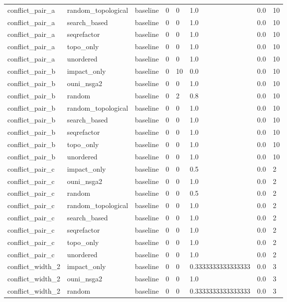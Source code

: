 \begin{table}[t]
\begin{tabular}{llllllll}
conflict\_pair\_a & random\_topological & baseline & 0 & 0 & 1.0 & 0.0 & 10 \\
conflict\_pair\_a & search\_based & baseline & 0 & 0 & 1.0 & 0.0 & 10 \\
conflict\_pair\_a & seqrefactor & baseline & 0 & 0 & 1.0 & 0.0 & 10 \\
conflict\_pair\_a & topo\_only & baseline & 0 & 0 & 1.0 & 0.0 & 10 \\
conflict\_pair\_a & unordered & baseline & 0 & 0 & 1.0 & 0.0 & 10 \\
conflict\_pair\_b & impact\_only & baseline & 0 & 10 & 0.0 & 0.0 & 10 \\
conflict\_pair\_b & ouni\_nsga2 & baseline & 0 & 0 & 1.0 & 0.0 & 10 \\
conflict\_pair\_b & random & baseline & 0 & 2 & 0.8 & 0.0 & 10 \\
conflict\_pair\_b & random\_topological & baseline & 0 & 0 & 1.0 & 0.0 & 10 \\
conflict\_pair\_b & search\_based & baseline & 0 & 0 & 1.0 & 0.0 & 10 \\
conflict\_pair\_b & seqrefactor & baseline & 0 & 0 & 1.0 & 0.0 & 10 \\
conflict\_pair\_b & topo\_only & baseline & 0 & 0 & 1.0 & 0.0 & 10 \\
conflict\_pair\_b & unordered & baseline & 0 & 0 & 1.0 & 0.0 & 10 \\
conflict\_pair\_c & impact\_only & baseline & 0 & 0 & 0.5 & 0.0 & 2 \\
conflict\_pair\_c & ouni\_nsga2 & baseline & 0 & 0 & 1.0 & 0.0 & 2 \\
conflict\_pair\_c & random & baseline & 0 & 0 & 0.5 & 0.0 & 2 \\
conflict\_pair\_c & random\_topological & baseline & 0 & 0 & 1.0 & 0.0 & 2 \\
conflict\_pair\_c & search\_based & baseline & 0 & 0 & 1.0 & 0.0 & 2 \\
conflict\_pair\_c & seqrefactor & baseline & 0 & 0 & 1.0 & 0.0 & 2 \\
conflict\_pair\_c & topo\_only & baseline & 0 & 0 & 1.0 & 0.0 & 2 \\
conflict\_pair\_c & unordered & baseline & 0 & 0 & 1.0 & 0.0 & 2 \\
conflict\_width\_2 & impact\_only & baseline & 0 & 0 & 0.3333333333333333 & 0.0 & 3 \\
conflict\_width\_2 & ouni\_nsga2 & baseline & 0 & 0 & 1.0 & 0.0 & 3 \\
conflict\_width\_2 & random & baseline & 0 & 0 & 0.3333333333333333 & 0.0 & 3 \\

\end{tabular}
\end{table}

